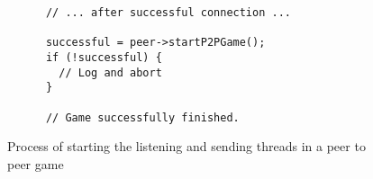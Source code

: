 \begin{figure}[!h]
  \centering
  \begin{lstlisting}
      // ... after successful connection ...

      successful = peer->startP2PGame();
      if (!successful) {
        // Log and abort
      }

      // Game successfully finished.
  \end{lstlisting}
  \caption{Process of starting the listening and sending threads in a peer to peer game}
  \label{code:peer_game}
\end{figure}
